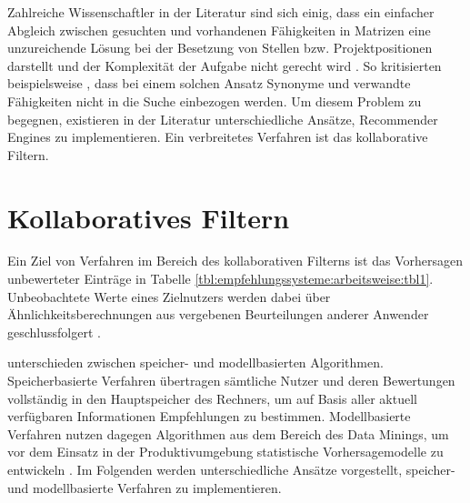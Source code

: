 Zahlreiche Wissenschaftler in der Literatur sind sich einig, dass ein einfacher Abgleich zwischen gesuchten und vorhandenen Fähigkeiten in Matrizen eine unzureichende Lösung bei der Besetzung von Stellen bzw. Projektpositionen darstellt \cite[S. 1]{enhancingERecruitment:2012}\cite[S. 1]{faerber:2003}\cite[S. 2]{prospect:2010} und der Komplexität der Aufgabe nicht gerecht wird \cite[S. 1]{malinowski:2008}. So kritisierten beispielsweise \textcite[S. 1f.]{mitre:2014}, dass bei einem solchen Ansatz Synonyme und verwandte Fähigkeiten nicht in die Suche einbezogen werden. Um diesem Problem zu begegnen, existieren in der Literatur unterschiedliche Ansätze, Recommender Engines zu implementieren. Ein verbreitetes Verfahren ist das kollaborative Filtern.

\section{Kollaboratives Filtern}
\label{ch:empfehlungssysteme:cf}
Ein Ziel von Verfahren im Bereich des kollaborativen Filterns ist das Vorhersagen unbewerteter Einträge in Tabelle \ref{tbl:empfehlungssysteme:arbeitsweise:tbl1}. Unbeobachtete Werte eines Zielnutzers werden dabei über Ähnlichkeitsberechnungen aus vergebenen Beurteilungen anderer Anwender geschlussfolgert \cite[S. 1]{su:2009}.

\textcite[S. 3]{breese:1998} unterschieden zwischen speicher- und modellbasierten Algorithmen. Speicherbasierte Verfahren übertragen sämtliche Nutzer und deren Bewertungen vollständig in den Hauptspeicher des Rechners, um auf Basis aller aktuell verfügbaren Informationen Empfehlungen zu bestimmen. Modellbasierte Verfahren nutzen dagegen Algorithmen aus dem Bereich des Data Minings, um vor dem Einsatz in der Produktivumgebung statistische Vorhersagemodelle zu entwickeln \cite[S. 3]{breese:1998}\cite[S. 11]{schafer:2007}. Im Folgenden werden unterschiedliche Ansätze vorgestellt, speicher- und modellbasierte Verfahren zu implementieren.

